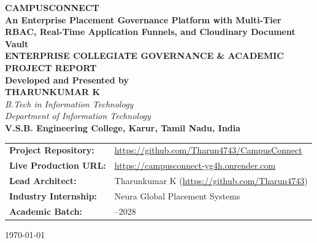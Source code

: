 \documentclass[12pt,a4paper]{report}
\begin{document}
\begin{titlepage}
    \centering
    \vspace*{0.8cm}
    
    {\Huge \textbf{CAMPUSCONNECT}}\\[0.3cm]
    {\LARGE \textbf{An Enterprise Placement Governance Platform with Multi-Tier RBAC, Real-Time Application Funnels, and Cloudinary Document Vault}}\\[1.2cm]
    
    {\large \textbf{ENTERPRISE COLLEGIATE GOVERNANCE \& ACADEMIC PROJECT REPORT}}\\[1.0cm]
    
    \textbf{Developed and Presented by}\\[0.3cm]
    {\Large \textbf{THARUNKUMAR K}}\\[0.2cm]
    \textit{B.Tech in Information Technology}\\[0.1cm]
    \textit{Department of Information Technology}\\[0.2cm]
    \textbf{V.S.B. Engineering College, Karur, Tamil Nadu, India}\\[1.5cm]
    
    \vfill
    
    \begin{tabular}{>{\raggedright\arraybackslash\bfseries}p{4.2cm}>{\raggedright\arraybackslash}p{10.2cm}}
        Project Repository: & \url{https://github.com/Tharun4743/CampusConnect} \\
        Live Production URL: & \url{https://campusconnect-yg4h.onrender.com} \\
        Lead Architect: & Tharunkumar K (\url{https://github.com/Tharun4743}) \\
        Industry Internship: & Neura Global Placement Systems \\
        Academic Batch: & 2024--2028 \\
    \end{tabular}
    
    \vspace*{0.8cm}
    {\small \today}
\end{titlepage}

\cleardoublepage
{}
\setcounter{page}{1}
\end{document}
